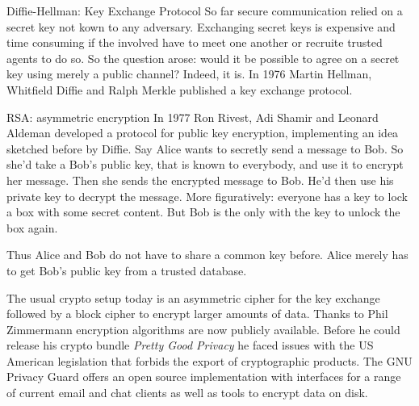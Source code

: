 \documentclass[final,hyperref={pdfpagelabels=false}]{beamer}
\begin{document}
\begin{frame}{}
\begin{columns}[t]
\begin{column}{.3\linewidth}
        \begin{block}{Diffie-Hellman: Key Exchange Protocol}
          So far secure communication relied on a secret key not kown to any adversary. Exchanging secret keys is expensive and time consuming if the involved have to meet one another or recruite trusted agents to do so. So the question arose: would it be possible to agree on a secret key using merely a public channel? Indeed, it is. In 1976 Martin Hellman, Whitfield Diffie and Ralph Merkle published a key exchange protocol.
        \end{block}

        \begin{block}{RSA: asymmetric encryption}
          In 1977 Ron Rivest, Adi Shamir and Leonard Aldeman developed a protocol for public key encryption, implementing an idea sketched before by Diffie. Say Alice wants to secretly send a message to Bob. So she'd take a Bob's public key, that is known to everybody, and use it to encrypt her message. Then she sends the encrypted message to Bob. He'd then use his private key to decrypt the message. More figuratively: everyone has a key to lock a box with some secret content. But Bob is the only with the key to unlock the box again.\par
          Thus Alice and Bob do not have to share a common key before. Alice merely has to get Bob's public key from a trusted database. \par
          The usual crypto setup today is an asymmetric cipher for the key exchange followed by a block cipher to encrypt larger amounts of data. Thanks to Phil Zimmermann encryption algorithms are now publicly available. Before he could release his crypto bundle {\em Pretty Good Privacy} he faced issues with the US American legislation that forbids the export of cryptographic products. The GNU Privacy Guard offers an open source implementation with interfaces for a range of current email and chat clients as well as tools to encrypt data on disk.
        \end{block}


\end{column}
\end{columns}
\end{frame}
\end{document}
